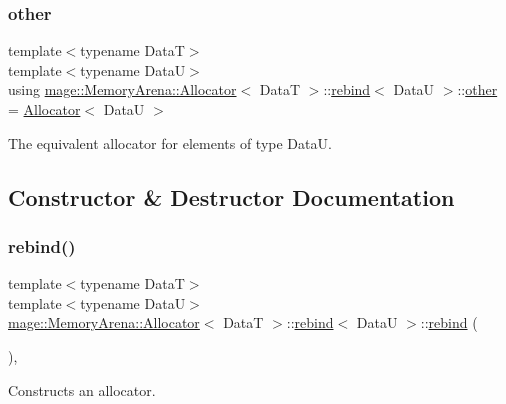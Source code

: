 \subsubsection{\texorpdfstring{other}{other}}
{\footnotesize\ttfamily template$<$typename DataT$>$ \\
template$<$typename DataU$>$ \\
using \hyperlink{structmage_1_1_memory_arena_1_1_allocator}{mage\+::\+Memory\+Arena\+::\+Allocator}$<$ DataT $>$\+::\hyperlink{structmage_1_1_memory_arena_1_1_allocator_1_1rebind}{rebind}$<$ DataU $>$\+::\hyperlink{structmage_1_1_memory_arena_1_1_allocator_1_1rebind_aad55bf384b9a95ae1c2158f1d2afe180}{other} =  \hyperlink{structmage_1_1_memory_arena_1_1_allocator}{Allocator}$<$ DataU $>$}

The equivalent allocator for elements of type {\ttfamily DataU}. 

\subsection{Constructor \& Destructor Documentation}
\hypertarget{structmage_1_1_memory_arena_1_1_allocator_1_1rebind_accff2c1aafa45e3c5cc9f5d66b4a3bb5}{}\label{structmage_1_1_memory_arena_1_1_allocator_1_1rebind_accff2c1aafa45e3c5cc9f5d66b4a3bb5} 
\subsubsection{\texorpdfstring{rebind()}{rebind()}\hspace{0.1cm}{\footnotesize\ttfamily [1/3]}}
{\footnotesize\ttfamily template$<$typename DataT$>$ \\
template$<$typename DataU$>$ \\
\hyperlink{structmage_1_1_memory_arena_1_1_allocator}{mage\+::\+Memory\+Arena\+::\+Allocator}$<$ DataT $>$\+::\hyperlink{structmage_1_1_memory_arena_1_1_allocator_1_1rebind}{rebind}$<$ DataU $>$\+::\hyperlink{structmage_1_1_memory_arena_1_1_allocator_1_1rebind}{rebind} (\begin{DoxyParamCaption}{ }\end{DoxyParamCaption})\hspace{0.3cm}{\ttfamily [private]}, {\ttfamily [delete]}}

Constructs an allocator. \hypertarget{structmage_1_1_memory_arena_1_1_allocator_1_1rebind_ad77d68305f2e8f5ddd4080e6f992efec}{}\label{structmage_1_1_memory_arena_1_1_allocator_1_1rebind_ad77d68305f2e8f5ddd4080e6f992efec} 
